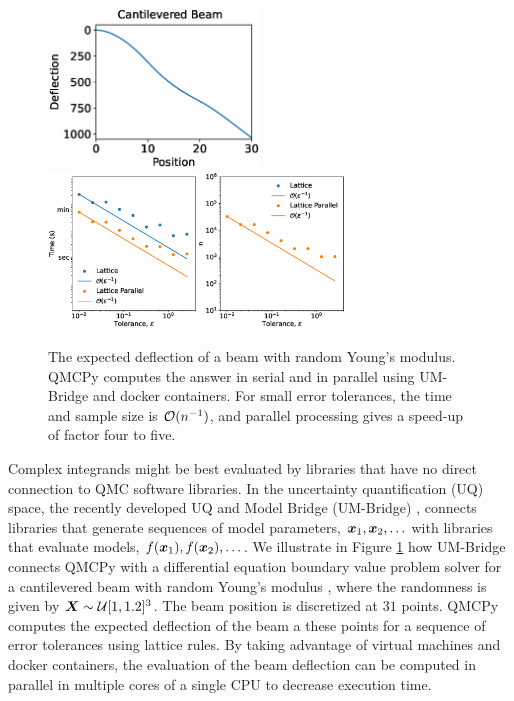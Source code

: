 \documentclass[graybox]{svmult}
\begin{document}
\begin{figure}
    \centering
    \includegraphics[width=0.5\textwidth]{cantileveredbeamwords.eps}
    \includegraphics[width=0.7\textwidth]{ldparallelbeam.eps}
    \caption{The expected deflection of a beam with random Young's modulus.  QMCPy computes the answer in serial and in parallel using UM-Bridge and docker containers.  For small error tolerances, the time and sample size is ${\mathcal{O}}(n^{-1})$, and parallel processing gives a speed-up of factor four to five.}
    \label{fig:beam}
\end{figure}

Complex integrands might be best evaluated by libraries that have no direct connection to QMC software libraries.  In the uncertainty quantification (UQ) space, the recently developed UQ and Model Bridge (UM-Bridge) \cite{umbridge}, connects libraries that generate sequences of model parameters, ${\boldsymbol{x}}_1, {\boldsymbol{x}}_2, \ldots$ with libraries that evaluate models, $f({\boldsymbol{x}}_1), f({\boldsymbol{x}}_2), \ldots$.  We illustrate in Figure \ref{fig:beam} how UM-Bridge connects QMCPy with a differential equation boundary value problem solver for a cantilevered beam with random Young's modulus \cite{ParSee22a}, where the randomness is given by ${\boldsymbol{X}} \sim {\mathcal{U}}[1,1.2]^3$.  The beam position is discretized at $31$ points.  QMCPy computes the expected deflection of the beam a these points for a sequence of error tolerances using lattice rules.  By taking advantage of virtual machines and docker containers, the evaluation of the beam deflection can be computed in parallel in multiple cores of a single CPU to decrease execution time.
\end{document}
